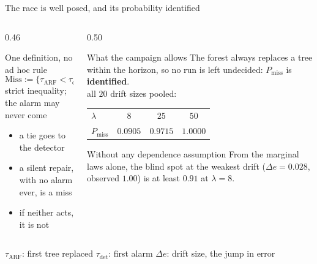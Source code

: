 \documentclass[aspectratio=169,11pt]{beamer}
\begin{document}
\begin{frame}{The race is well posed, and its probability identified}
  \begin{columns}[T,onlytextwidth]
    \begin{column}{0.46\textwidth}
      \begin{block}{One definition, no ad hoc rule}
        \[
          \mathrm{Miss} := \{\tau_{\mathrm{ARF}} < \tau_{\mathrm{det}}\}
        \]
        \vspace{-0.6em}
        {\small strict inequality; the alarm may never come}
        \begin{itemize}
          \item a tie goes to the detector
          \item a silent repair, with no alarm ever, \alert{is} a miss
          \item if neither acts, it is not
        \end{itemize}
      \end{block}
    \end{column}\hfill
    \begin{column}{0.50\textwidth}
      \begin{exampleblock}{What the campaign allows}
        The forest always replaces a tree within the horizon, so no run is left
        undecided: $P_{\mathrm{miss}}$ is \textbf{identified}.\\[0.3em]
        \centering
        {\small all $20$ drift sizes pooled:}\\[0.1em]
        \begin{tabular}{@{}lccc@{}}
          $\lambda$ & $8$ & $25$ & $50$ \\
          $P_{\mathrm{miss}}$ & $0.0905$ & $0.9715$ & $1.0000$
        \end{tabular}
      \end{exampleblock}
      \begin{alertblock}{Without any dependence assumption}
        From the marginal laws alone, the blind spot at the weakest drift
        ($\Delta e = 0.028$, observed $1.00$) is at least $0.91$ at $\lambda = 8$.
      \end{alertblock}
    \end{column}
  \end{columns}
  \vspace{0.3em}
  {\scriptsize\color{gray} $\tau_{\mathrm{ARF}}$: first tree replaced \quad
   $\tau_{\mathrm{det}}$: first alarm \quad $\Delta e$: drift size, the jump in error}
\end{frame}
\end{document}
